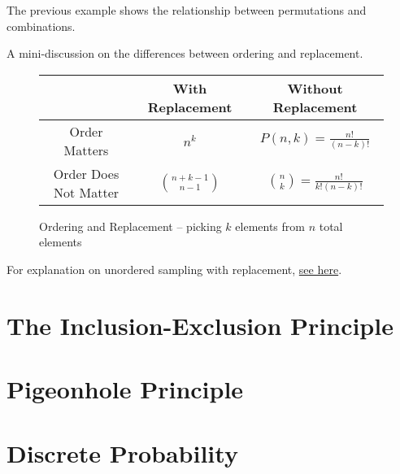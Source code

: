 \documentclass[main.tex]{subfiles}
\begin{document}
\begin{rem}
	The previous example shows the relationship between permutations and combinations. %
\end{rem}

A mini-discussion on the differences between ordering and replacement.

\begin{figure}[H]
	\centering
	\begin{tabular}{ccc}
		& With Replacement & Without Replacement \\
		\midrule
		Order Matters & \(n^k\) & \(P(n,k) = \frac{n!}{(n-k)!}\) \\
		\midrule
		Order Does Not Matter & \(\binom{n+k-1}{n-1}\) & \(\binom{n}{k} = \frac{n!}{k!(n-k)!}\) \\
	\end{tabular}
	\caption{Ordering and Replacement -- picking \(k\) elements from \(n\) total elements}
\end{figure}

\begin{rem}
	For explanation on unordered sampling with replacement, \href{https://www.probabilitycourse.com/chapter2/2_1_4_unordered_with_replacement.php}{see here}.
\end{rem}

\section{The Inclusion-Exclusion Principle}

\begin{thm}
	
\end{thm}



\section{Pigeonhole Principle}

\begin{thm}
	
\end{thm}

\begin{thm}
	
\end{thm}

\section{Discrete Probability}
\end{document}
